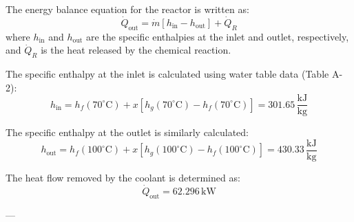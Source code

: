 The energy balance equation for the reactor is written as:  
\[
\dot{Q}_{\text{out}} = \dot{m} \left[ h_{\text{in}} - h_{\text{out}} \right] + \dot{Q}_R
\]  
where \( h_{\text{in}} \) and \( h_{\text{out}} \) are the specific enthalpies at the inlet and outlet, respectively, and \( \dot{Q}_R \) is the heat released by the chemical reaction.  

The specific enthalpy at the inlet is calculated using water table data (Table A-2):  
\[
h_{\text{in}} = h_f(70^\circ\text{C}) + x \left[ h_g(70^\circ\text{C}) - h_f(70^\circ\text{C}) \right] = 301.65 \, \frac{\text{kJ}}{\text{kg}}
\]  

The specific enthalpy at the outlet is similarly calculated:  
\[
h_{\text{out}} = h_f(100^\circ\text{C}) + x \left[ h_g(100^\circ\text{C}) - h_f(100^\circ\text{C}) \right] = 430.33 \, \frac{\text{kJ}}{\text{kg}}
\]  

The heat flow removed by the coolant is determined as:  
\[
\dot{Q}_{\text{out}} = 62.296 \, \text{kW}
\]  

---